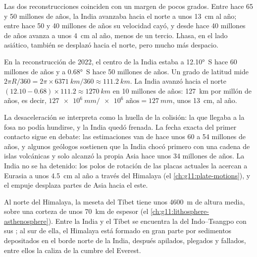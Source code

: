 Las dos reconstrucciones coinciden con un margen de pocos grados. Entre hace
65 y 50 millones de años, la India avanzaba hacia el norte a unos
\qty{13}{cm} al año; entre hace 50 y 40 millones de años su velocidad cayó, y
desde hace 40 millones de años avanza a unos \qty{4}{cm} al año, menos de un
tercio. Lhasa, en el lado asiático, también se desplazó hacia el norte, pero
mucho más despacio.

\begin{example}\label{ex:g12:mountain-building:india}
En la reconstrucción de 2022, el centro de la India estaba a \ang{12.10}~S
hace 60 millones de años y a \ang{0.68}~S hace 50 millones de años. Un grado
de latitud mide
$2\pi R/360 = 2\pi \times \qty{6371}{km}/360 \approx \qty{111.2}{km}$. La
India avanzó hacia el norte $(12.10 - 0.68) \times 111.2 \approx \qty{1270}{km}$ en 10 millones de años: \qty{127}{km} por millón de años, es
decir, $\qty{127e6}{mm} /
\num{e6}\text{ años} = \qty{127}{mm}$, unos \qty{13}{cm}, al año.
\end{example}

La desaceleración se interpreta como la huella de la colisión: la  que llegaba a la fosa no podía hundirse, y la India quedó
frenada. La fecha exacta del primer contacto sigue en debate: las
estimaciones van de hace unos 60 a 54 millones de años, y algunos geólogos
sostienen que la India chocó primero con una cadena de islas volcánicas y
solo alcanzó la propia Asia hace unos 34 millones de años. La India no se ha
detenido: los polos de rotación de las placas actuales la acercan a Eurasia a
unos \qty{4.5}{cm} al año a través del Himalaya (el
\cref{ch:g11:plate-motions}), y el empuje desplaza partes de Asia hacia el
este.

Al norte del Himalaya, la meseta del Tíbet tiene unos \qty{4600}{m} de altura
media, sobre una corteza de unos \qty{70}{km} de espesor
(el \cref{ch:g11:lithosphere-asthenosphere}). Entre la India y el Tíbet se
encuentra la  del Indo--Tsangpo con sus ; al sur de ella, el
Himalaya está formado en gran parte por sedimentos depositados en el borde
norte de la India, después apilados, plegados y fallados, entre ellos la
caliza de la cumbre del Everest.

